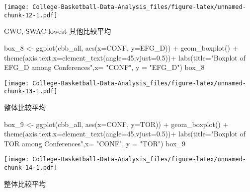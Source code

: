 \documentclass[
]{article}
\newenvironment{Shaded}{\begin{snugshade}}{\end{snugshade}}
\newcommand{\AttributeTok}[1]{\textcolor[rgb]{0.77,0.63,0.00}{#1}}
\newcommand{\DecValTok}[1]{\textcolor[rgb]{0.00,0.00,0.81}{#1}}
\newcommand{\FloatTok}[1]{\textcolor[rgb]{0.00,0.00,0.81}{#1}}
\newcommand{\FunctionTok}[1]{\textcolor[rgb]{0.00,0.00,0.00}{#1}}
\newcommand{\NormalTok}[1]{#1}
\newcommand{\OtherTok}[1]{\textcolor[rgb]{0.56,0.35,0.01}{#1}}
\newcommand{\SpecialCharTok}[1]{\textcolor[rgb]{0.00,0.00,0.00}{#1}}
\newcommand{\StringTok}[1]{\textcolor[rgb]{0.31,0.60,0.02}{#1}}
\begin{document}
\texttt{[image: College-Basketball-Data-Analysis\_files/figure-latex/unnamed-chunk-12-1.pdf]}

GWC, SWAC lowest 其他比较平均

\begin{Shaded}
\begin{Highlighting}[]
\NormalTok{box\_8 }\OtherTok{\textless{}{-}} \FunctionTok{ggplot}\NormalTok{(cbb\_all, }\FunctionTok{aes}\NormalTok{(}\AttributeTok{x=}\NormalTok{CONF, }\AttributeTok{y=}\NormalTok{EFG\_D)) }\SpecialCharTok{+} \FunctionTok{geom\_boxplot}\NormalTok{() }\SpecialCharTok{+} \FunctionTok{theme}\NormalTok{(}\AttributeTok{axis.text.x=}\FunctionTok{element\_text}\NormalTok{(}\AttributeTok{angle=}\DecValTok{45}\NormalTok{,}\AttributeTok{vjust=}\FloatTok{0.5}\NormalTok{))}\SpecialCharTok{+} \FunctionTok{labs}\NormalTok{(}\AttributeTok{title=}\StringTok{"Boxplot of EFG\_D among Conferences"}\NormalTok{,}\AttributeTok{x=} \StringTok{"CONF"}\NormalTok{, }\AttributeTok{y =} \StringTok{"EFG\_D"}\NormalTok{)}
\NormalTok{box\_8}
\end{Highlighting}
\end{Shaded}

\texttt{[image: College-Basketball-Data-Analysis\_files/figure-latex/unnamed-chunk-13-1.pdf]}

整体比较平均

\begin{Shaded}
\begin{Highlighting}[]
\NormalTok{box\_9 }\OtherTok{\textless{}{-}} \FunctionTok{ggplot}\NormalTok{(cbb\_all, }\FunctionTok{aes}\NormalTok{(}\AttributeTok{x=}\NormalTok{CONF, }\AttributeTok{y=}\NormalTok{TOR)) }\SpecialCharTok{+} \FunctionTok{geom\_boxplot}\NormalTok{() }\SpecialCharTok{+} \FunctionTok{theme}\NormalTok{(}\AttributeTok{axis.text.x=}\FunctionTok{element\_text}\NormalTok{(}\AttributeTok{angle=}\DecValTok{45}\NormalTok{,}\AttributeTok{vjust=}\FloatTok{0.5}\NormalTok{))}\SpecialCharTok{+} \FunctionTok{labs}\NormalTok{(}\AttributeTok{title=}\StringTok{"Boxplot of TOR among Conferences"}\NormalTok{,}\AttributeTok{x=} \StringTok{"CONF"}\NormalTok{, }\AttributeTok{y =} \StringTok{"TOR"}\NormalTok{)}
\NormalTok{box\_9}
\end{Highlighting}
\end{Shaded}

\texttt{[image: College-Basketball-Data-Analysis\_files/figure-latex/unnamed-chunk-14-1.pdf]}

整体比较平均
\end{document}
